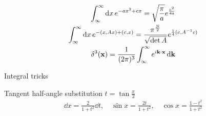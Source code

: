 \documentclass[main]{subfiles}
\begin{document}
\begin{multicols}{2}

\begin{gather}
\int^\infty_\infty\dd{x}e^{-ax^{2}+cx} = \sqrt{\frac{\pi}{a}}e^{\frac{c^2}{4a}}\\
\int^\infty_\infty\dd{x}e^{-(x,Ax)+(c,x)} = \frac{\pi^{\frac{N}{2}}}{\sqrt{\det A}} e^{\frac{1}{4}(c,A^{-1}c)}\\
\delta^3(\vb{x}) = \frac{1}{(2\pi)^3} \int_\infty^\infty e^{i\vb{k}\cdot \vb{x}}\dd{\vb{k}}
\end{gather}
\end{multicols}

Integral tricks
\begin{multicols}{2}
    Tangent half-angle substitution $t = \tan \frac{x}{2}$
    \begin{gather*}
        \dd x = \frac{2}{1 + t^2}\dd t,\quad \sin{x} = \frac{2t}{1 + t^2},\quad \cos{x} = \frac{1 - t^2}{1 + t^2}
    \end{gather*}
\end{multicols}
\end{document}
